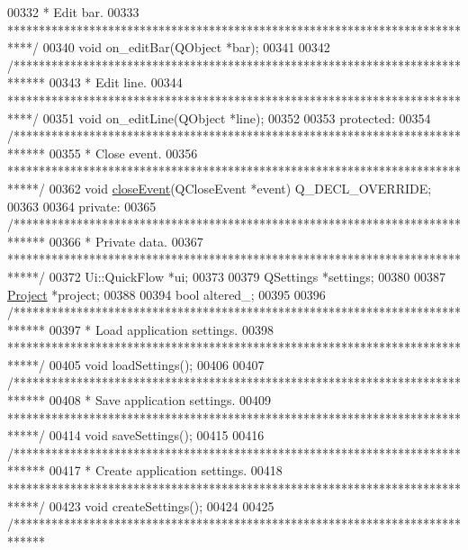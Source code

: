 \begin{DoxyCode}
00332 \textcolor{comment}{   * Edit bar.}
00333 \textcolor{comment}{   ****************************************************************************/}
00340   \textcolor{keywordtype}{void} on\_editBar(QObject *bar);
00341 
00342   \textcolor{comment}{/*****************************************************************************}
00343 \textcolor{comment}{   * Edit line.}
00344 \textcolor{comment}{   ****************************************************************************/}
00351   \textcolor{keywordtype}{void} on\_editLine(QObject *line);
00352 
00353 \textcolor{keyword}{protected}:
00354   \textcolor{comment}{/*****************************************************************************}
00355 \textcolor{comment}{  * Close event.}
00356 \textcolor{comment}{  *****************************************************************************/}
00362   \textcolor{keywordtype}{void} \hyperlink{group___window_gac8cc1bb329961a0781ffed7b6f2ab402}{closeEvent}(QCloseEvent *event) Q\_DECL\_OVERRIDE;
00363 
00364 \textcolor{keyword}{private}:
00365   \textcolor{comment}{/*****************************************************************************}
00366 \textcolor{comment}{  * Private data.}
00367 \textcolor{comment}{  *****************************************************************************/}
00372   Ui::QuickFlow *ui;
00373 
00379   QSettings *settings;
00380 
00387   \hyperlink{class_project}{Project} *project;
00388 
00394   \textcolor{keywordtype}{bool} altered\_;
00395 
00396   \textcolor{comment}{/*****************************************************************************}
00397 \textcolor{comment}{  * Load application settings.}
00398 \textcolor{comment}{  *****************************************************************************/}
00405   \textcolor{keywordtype}{void} loadSettings();
00406 
00407   \textcolor{comment}{/*****************************************************************************}
00408 \textcolor{comment}{  * Save application settings.}
00409 \textcolor{comment}{  *****************************************************************************/}
00414   \textcolor{keywordtype}{void} saveSettings();
00415 
00416   \textcolor{comment}{/*****************************************************************************}
00417 \textcolor{comment}{  * Create application settings.}
00418 \textcolor{comment}{  *****************************************************************************/}
00423   \textcolor{keywordtype}{void} createSettings();
00424 
00425   \textcolor{comment}{/*****************************************************************************}

\end{DoxyCode}
